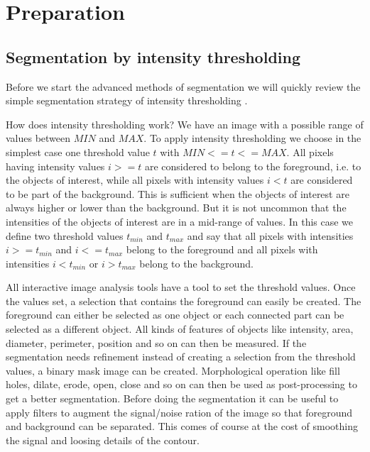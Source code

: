 \chapter{Preparation}

\section{Segmentation by intensity thresholding}

Before we start the advanced methods of segmentation we will quickly review the simple segmentation strategy of intensity thresholding \cite{bhargavi_survey_2014}.

How does intensity thresholding work? We have an image with a possible range of values between $MIN$ and $MAX$. To apply intensity thresholding we choose in the simplest case one threshold value $t$ with $MIN<=t<=MAX$. All pixels having intensity values $i>=t$ are considered to belong to the foreground, i.e. to the objects of interest, while all pixels with intensity values $i<t$ are considered to be part of the background. This is sufficient when the objects of interest are always higher or lower than the background. But it is not uncommon that the intensities of the objects of interest are in a mid-range of values. In this case we define two threshold values $t_{min}$ and $t_{max}$ and say that all pixels with intensities $i>=t_{min}$ and $i<=t_{max}$ belong to the foreground and all pixels with intensities $i<t_{min}$ or $i>t_{max}$ belong to the background.

All interactive image analysis tools have a tool to set the threshold values. Once the values set, a selection that contains the foreground can easily be created. The foreground can either be selected as one object or each connected part can be selected as a different object. All kinds of features of objects like intensity, area, diameter, perimeter, position and so on can then be measured. If the segmentation needs refinement instead of creating a selection from the threshold values, a binary mask image can be created. Morphological operation like fill holes, dilate, erode, open, close and so on can then be used as post-processing to get a better segmentation. Before doing the segmentation it can be useful to apply filters  to augment the signal/noise ration of the image so that foreground and background can be separated. This comes of course at the cost of smoothing the signal and loosing details of the contour. 

